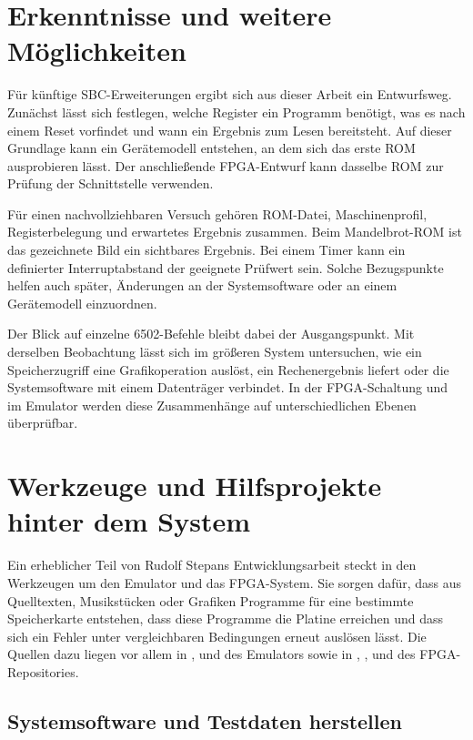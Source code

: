 \documentclass[fontsize=10.2bp,DIV=calc,oneside,open=any,headings=normal,numbers=noenddot]{scrbook}
\begin{document}
\section{Erkenntnisse und weitere Möglichkeiten}

Für künftige SBC-Erweiterungen ergibt sich aus dieser Arbeit ein
Entwurfsweg. Zunächst lässt sich festlegen, welche Register ein
Programm benötigt, was es nach einem Reset vorfindet und wann ein
Ergebnis zum Lesen bereitsteht. Auf dieser Grundlage kann ein
Gerätemodell entstehen, an dem sich das erste ROM ausprobieren lässt.
Der anschließende FPGA-Entwurf kann dasselbe ROM zur Prüfung der
Schnittstelle verwenden.

Für einen nachvollziehbaren Versuch gehören ROM-Datei, Maschinenprofil,
Registerbelegung und erwartetes Ergebnis zusammen. Beim Mandelbrot-ROM
ist das gezeichnete Bild ein sichtbares Ergebnis. Bei einem Timer kann
ein definierter Interruptabstand der geeignete Prüfwert sein. Solche
Bezugspunkte helfen auch später, Änderungen an der Systemsoftware oder
an einem Gerätemodell einzuordnen.

Der Blick auf einzelne 6502-Befehle bleibt dabei der Ausgangspunkt.
Mit derselben Beobachtung lässt sich im größeren System untersuchen,
wie ein Speicherzugriff eine Grafikoperation auslöst, ein Rechenergebnis
liefert oder die Systemsoftware mit einem Datenträger verbindet. In
der FPGA-Schaltung und im Emulator werden diese Zusammenhänge auf
unterschiedlichen Ebenen überprüfbar.

\clearpage
\section{Werkzeuge und Hilfsprojekte hinter dem System}\label{sec:engineering-tools}

Ein erheblicher Teil von Rudolf Stepans Entwicklungsarbeit steckt in
den Werkzeugen um den Emulator und das FPGA-System. Sie sorgen dafür,
dass aus Quelltexten, Musikstücken oder Grafiken Programme für eine
bestimmte Speicherkarte entstehen, dass diese Programme die Platine
erreichen und dass sich ein Fehler unter vergleichbaren Bedingungen
erneut auslösen lässt. Die Quellen dazu liegen vor allem in
,  und  des Emulators sowie
in , ,  und  des
FPGA-Repositories.

\subsection{Systemsoftware und Testdaten herstellen}
\end{document}
